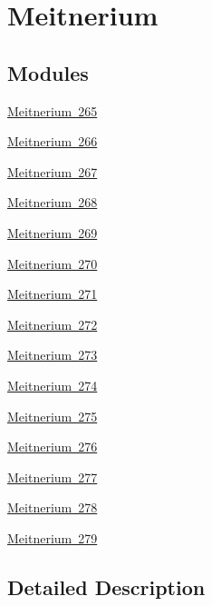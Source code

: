 \hypertarget{group___isotope_const-_meitnerium}{}\section{Meitnerium}
\label{group___isotope_const-_meitnerium}
\subsection*{Modules}
\begin{DoxyCompactItemize}
\item 
\mbox{\hyperlink{group___isotope_const-_meitnerium-_mt265}{Meitnerium 265}}
\item 
\mbox{\hyperlink{group___isotope_const-_meitnerium-_mt266}{Meitnerium 266}}
\item 
\mbox{\hyperlink{group___isotope_const-_meitnerium-_mt267}{Meitnerium 267}}
\item 
\mbox{\hyperlink{group___isotope_const-_meitnerium-_mt268}{Meitnerium 268}}
\item 
\mbox{\hyperlink{group___isotope_const-_meitnerium-_mt269}{Meitnerium 269}}
\item 
\mbox{\hyperlink{group___isotope_const-_meitnerium-_mt270}{Meitnerium 270}}
\item 
\mbox{\hyperlink{group___isotope_const-_meitnerium-_mt271}{Meitnerium 271}}
\item 
\mbox{\hyperlink{group___isotope_const-_meitnerium-_mt272}{Meitnerium 272}}
\item 
\mbox{\hyperlink{group___isotope_const-_meitnerium-_mt273}{Meitnerium 273}}
\item 
\mbox{\hyperlink{group___isotope_const-_meitnerium-_mt274}{Meitnerium 274}}
\item 
\mbox{\hyperlink{group___isotope_const-_meitnerium-_mt275}{Meitnerium 275}}
\item 
\mbox{\hyperlink{group___isotope_const-_meitnerium-_mt276}{Meitnerium 276}}
\item 
\mbox{\hyperlink{group___isotope_const-_meitnerium-_mt277}{Meitnerium 277}}
\item 
\mbox{\hyperlink{group___isotope_const-_meitnerium-_mt278}{Meitnerium 278}}
\item 
\mbox{\hyperlink{group___isotope_const-_meitnerium-_mt279}{Meitnerium 279}}
\end{DoxyCompactItemize}


\subsection{Detailed Description}
